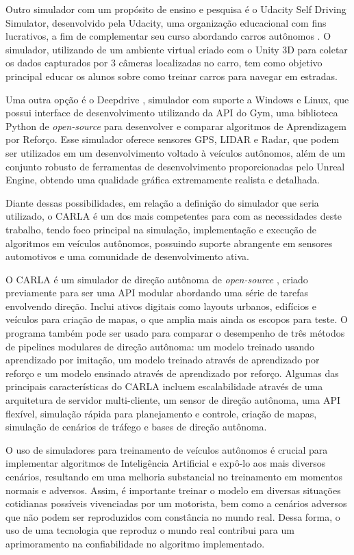 \documentclass[a4paper,12pt,Times]{article}
\begin{document}
Outro simulador com um propósito de ensino e pesquisa é o Udacity Self Driving Simulator, desenvolvido pela Udacity, uma organização educacional com fins lucrativos, a fim de complementar seu curso abordando carros autônomos \cite{udacity-sim}. O simulador, utilizando de um ambiente virtual criado com o Unity 3D para coletar os dados capturados por 3 câmeras localizadas no carro, tem como objetivo principal educar os alunos sobre como treinar carros para navegar em estradas. 

Uma outra opção é o Deepdrive \cite{deepdrive}, simulador com suporte a Windows e Linux, que possui interface de desenvolvimento utilizando da API do Gym, uma biblioteca Python de \textit{open-source} para desenvolver e comparar algoritmos de Aprendizagem por Reforço. Esse simulador oferece sensores GPS, LIDAR e Radar, que podem ser utilizados em um desenvolvimento voltado à veículos autônomos, além de um conjunto robusto de ferramentas de desenvolvimento proporcionadas pelo Unreal Engine, obtendo uma qualidade gráfica extremamente realista e detalhada.

Diante dessas possibilidades, em relação a definição do simulador que seria utilizado, o CARLA é um dos mais competentes para com as necessidades deste trabalho, tendo foco principal na simulação, implementação e execução de algoritmos em veículos autônomos, possuindo suporte abrangente em sensores automotivos e uma comunidade de desenvolvimento ativa.

O CARLA é um simulador de direção autônoma de \textit{open-source} \cite{Dosovitskiy17}, criado previamente para ser uma API modular abordando uma série de tarefas envolvendo direção. Inclui ativos digitais como layouts urbanos, edifícios e veículos para criação de mapas, o que amplia mais ainda os escopos para teste. O programa também pode ser usado para comparar o desempenho de três métodos de pipelines modulares de direção autônoma: um modelo treinado usando aprendizado por imitação, um modelo treinado através de aprendizado por reforço e um modelo ensinado através de aprendizado por reforço. Algumas das principais características do CARLA incluem escalabilidade através de uma arquitetura de servidor multi-cliente, um sensor de direção autônoma, uma API flexível, simulação rápida para planejamento e controle, criação de mapas, simulação de cenários de tráfego e bases de direção autônoma.


O uso de simuladores para treinamento de veículos autônomos é crucial para implementar algoritmos de Inteligência Artificial e expô-lo aos mais diversos cenários, resultando em uma melhoria substancial no treinamento em momentos normais e adversos. Assim, é importante treinar o modelo em diversas situações cotidianas possíveis vivenciadas por um motorista, bem como a cenários adversos que não podem ser reproduzidos com constância no mundo real. Dessa forma, o uso de uma tecnologia que reproduz o mundo real contribui para um aprimoramento na confiabilidade no algoritmo implementado.
\end{document}
